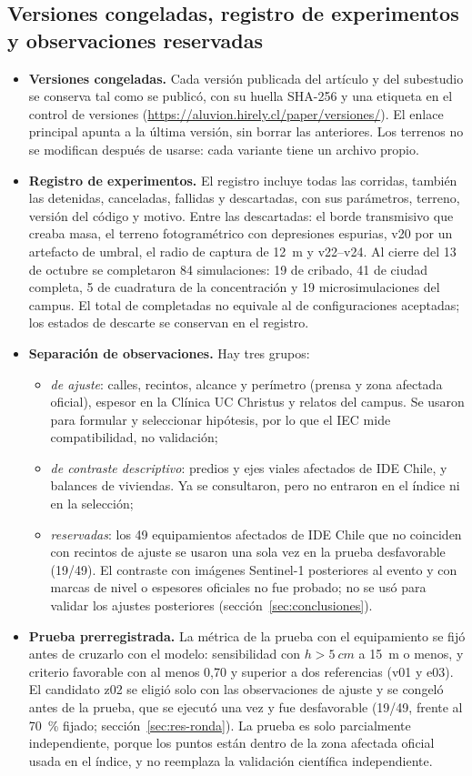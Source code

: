 \subsection*{Versiones congeladas, registro de experimentos y observaciones reservadas}
\begin{itemize}
\item \textbf{Versiones congeladas.} Cada versión publicada del artículo y del subestudio se conserva tal como se publicó, con su huella SHA-256 y una etiqueta en el control de versiones (\url{https://aluvion.hirely.cl/paper/versiones/}). El enlace principal apunta a la última versión, sin borrar las anteriores. Los terrenos no se modifican después de usarse: cada variante tiene un archivo propio.
\item \textbf{Registro de experimentos.} El registro incluye todas las corridas, también las detenidas, canceladas, fallidas y descartadas, con sus parámetros, terreno, versión del código y motivo. Entre las descartadas: el borde transmisivo que creaba masa, el terreno fotogramétrico con depresiones espurias, v20 por un artefacto de umbral, el radio de captura de \SI{12}{m} y v22--v24. Al cierre del 13 de octubre se completaron 84 simulaciones: 19 de cribado, 41 de ciudad completa, 5 de cuadratura de la concentración y 19 microsimulaciones del campus. El total de completadas no equivale al de configuraciones aceptadas; los estados de descarte se conservan en el registro.
\item \textbf{Separación de observaciones.} Hay tres grupos:
  \begin{itemize}
  \item \emph{de ajuste}: calles, recintos, alcance y perímetro (prensa y zona afectada oficial), espesor en la Clínica UC Christus y relatos del campus. Se usaron para formular y seleccionar hipótesis, por lo que el IEC mide compatibilidad, no validación;
  \item \emph{de contraste descriptivo}: predios y ejes viales afectados de IDE Chile, y balances de viviendas. Ya se consultaron, pero no entraron en el índice ni en la selección;
  \item \emph{reservadas}: los 49 equipamientos afectados de IDE Chile que no coinciden con recintos de ajuste se usaron una sola vez en la prueba desfavorable (19/49). El contraste con imágenes Sentinel-1 posteriores al evento y con marcas de nivel o espesores oficiales no fue probado; no se usó para validar los ajustes posteriores (sección~\ref{sec:conclusiones}).
  \end{itemize}
\item \textbf{Prueba prerregistrada.} La métrica de la prueba con el equipamiento se fijó antes de cruzarlo con el modelo: sensibilidad con $h>\SI{5}{cm}$ a \SI{15}{m} o menos, y criterio favorable con al menos 0,70 y superior a dos referencias (v01 y e03). El candidato z02 se eligió solo con las observaciones de ajuste y se congeló antes de la prueba, que se ejecutó una vez y fue desfavorable (19/49, frente al \SI{70}{\percent} fijado; sección~\ref{sec:res-ronda}). La prueba es solo parcialmente independiente, porque los puntos están dentro de la zona afectada oficial usada en el índice, y no reemplaza la validación científica independiente.
\end{itemize}
